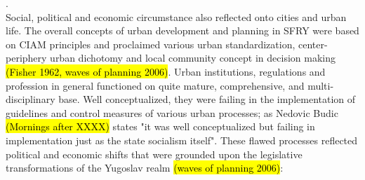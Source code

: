 \documentclass[11pt]{report}
\begin{document}
.
\\
Social, political and economic circumstance also reflected onto cities and urban life. The overall concepts of urban development and planning in SFRY were based on CIAM principles and proclaimed various urban standardization, center-periphery urban dichotomy and local community concept in decision making \hl{(Fisher 1962, waves of planning 2006)}. Urban institutions, regulations and profession in general functioned on quite mature, comprehensive, and multi-disciplinary base. Well conceptualized, they were failing in the implementation of guidelines and control measures of various urban processes; as Nedovic Budic \hl{(Mornings after XXXX)} states "it was well conceptualized but failing in implementation just as the state socialism itself".
These flawed processes reflected political and economic shifts that were grounded upon the legislative transformations of the Yugoslav realm \hl{(waves of planning 2006)}:
\end{document}
